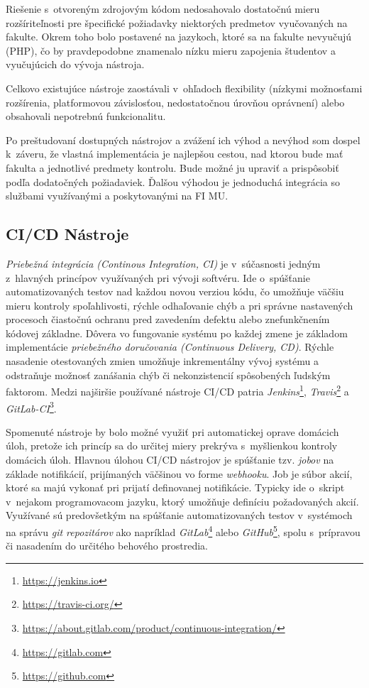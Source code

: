 \documentclass[
  digital, %
  oneside, %
  table,   %
  lof,     %
  lot,   %
]{fithesis3}
\begin{document}
Riešenie s~otvoreným zdrojovým kódom nedosahovalo dostatočnú mieru rozšíriteľnosti pre špecifické požiadavky niektorých predmetov vyučovaných na fakulte. Okrem toho bolo postavené na jazykoch, ktoré sa na fakulte nevyučujú (PHP), čo by pravdepodobne znamenalo nízku mieru zapojenia študentov a vyučujúcich do vývoja nástroja.

Celkovo existujúce nástroje zaostávali v~ohľadoch flexibility (nízkymi možnosťami rozšírenia, platformovou závislosťou, nedostatočnou úrovňou oprávnení) alebo obsahovali nepotrebnú funkcionalitu.

Po preštudovaní dostupných nástrojov a zvážení ich výhod a nevýhod som dospel k~záveru, že vlastná implementácia je najlepšou cestou, nad ktorou bude mať fakulta a jednotlivé predmety kontrolu. Bude možné ju upraviť a prispôsobiť podľa dodatočných požiadaviek. Ďalšou výhodou je jednoduchá integrácia so službami využívanými a poskytovanými na FI MU.

\subsection{CI/CD Nástroje}

\emph{Priebežná integrácia (Continous Integration, CI)}\cite{mfowler-ci} je v~súčasnosti jedným z~hlavných princípov využívaných pri vývoji softvéru. Ide o~spúšťanie automatizovaných testov nad každou novou verziou kódu, čo umožňuje väčšiu mieru kontroly spoľahlivosti, rýchle odhaľovanie chýb a pri správne nastavených procesoch čiastočnú ochranu pred zavedením defektu alebo znefunkčnením kódovej základne. Dôvera vo fungovanie systému po každej zmene je základom implementácie \emph{priebežného doručovania (Continuous Delivery, CD)}\cite{continous-delivery}. Rýchle nasadenie otestovaných zmien umožňuje inkrementálny vývoj systému a odstraňuje možnosť zanášania chýb či nekonzistencií spôsobených ľudským faktorom. Medzi najširšie používané nástroje CI/CD patria \textit{Jenkins}\footnote{\url{https://jenkins.io}}, \textit{Travis}\footnote{\url{https://travis-ci.org/}} a \textit{GitLab-CI}\footnote{\url{https://about.gitlab.com/product/continuous-integration/}}. 

Spomenuté nástroje by bolo možné využiť pri automatickej oprave domácich úloh, pretože ich princíp sa do určitej miery prekrýva s~myšlienkou kontroly domácich úloh. Hlavnou úlohou CI/CD nástrojov je spúšťanie tzv. \emph{jobov} na základe notifikácií, prijímaných väčšinou vo forme \emph{webhooku}. Job je súbor akcií, ktoré sa majú vykonať pri prijatí definovanej notifikácie. Typicky ide o~skript v~nejakom programovacom jazyku, ktorý umožňuje definíciu požadovaných akcií. Využívané sú predovšetkým na spúšťanie automatizovaných testov v~systémoch na správu \emph{git repozitárov} ako napríklad \emph{GitLab}\footnote{\url{https://gitlab.com}} alebo \emph{GitHub}\footnote{\url{https://github.com}}, spolu s~prípravou či nasadením do určitého behového prostredia.  
\end{document}
